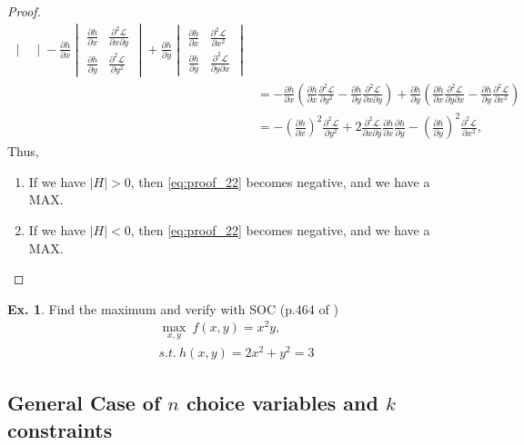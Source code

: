 \documentclass[10pt,a4paper]{book}
\theoremstyle{definition}\newtheorem{definition}{Definition}
\theoremstyle{definition}\newtheorem{fact}{Fact}
\theoremstyle{definition}\newtheorem{ex}{Ex.}
\theoremstyle{definition}\newtheorem{project}{Project}
\theoremstyle{definition}\newtheorem{problem}{Problem}
\theoremstyle{definition}\newtheorem{example}{Example}
\numberwithin{theorem}{chapter}
\numberwithin{corollary}{chapter}
\numberwithin{assumption}{chapter}
\numberwithin{definition}{chapter}
\numberwithin{prop}{chapter}
\numberwithin{notation}{chapter}
\numberwithin{problem}{chapter}
\numberwithin{example}{chapter}
\numberwithin{fact}{chapter}
\numberwithin{ex}{chapter}
\begin{document}
\begin{proof}
\begin{align*}
\begin{vmatrix}
			\end{vmatrix}
		- \frac{\partial h}{\partial x} \begin{vmatrix}
			\frac{\partial h }{\partial x} & \frac{\partial^2 \mathcal{L}}{\partial x \partial y} \\
			\frac{\partial h }{\partial y } & \frac{\partial^2 \mathcal{L}}{\partial y^2}
		\end{vmatrix}
		+ \frac{\partial h}{\partial y} 	\begin{vmatrix}
			\frac{\partial h }{\partial x} & \frac{\partial^2 \mathcal{L}}{\partial x^2 } \\
			\frac{\partial h }{\partial y } & \frac{\partial^2 \mathcal{L}}{\partial y \partial x}
		\end{vmatrix} \\
		&= - \frac{\partial h}{\partial x} \left(\frac{\partial h}{\partial x} \frac{\partial^2\mathcal{L}}{\partial y^2} - \frac{\partial h}{\partial y} \frac{\partial^2\mathcal{L}}{\partial x\partial y} \right) + \frac{\partial h}{\partial y} \left( \frac{\partial h}{\partial x} \frac{\partial^2 \mathcal{L}}{\partial y \partial x} - \frac{\partial h}{\partial y} \frac{\partial^2\mathcal{L}}{\partial x^2} \right)		\\
		&= - \left(\frac{\partial h}{\partial x}\right)^2 \frac{\partial^2 \mathcal{L}}{\partial y^2} + 2 \frac{\partial^2\mathcal{L}}{\partial x\partial y} \frac{\partial h}{\partial x} \frac{\partial h}{\partial y} - \left(\frac{\partial h}{\partial y}\right)^2 \frac{\partial^2 \mathcal{L}}{\partial x^2},
		\end{align*}
		Thus,
		\begin{enumerate}
			\item If we have $|H| > 0$, then \eqref{eq:proof_22} becomes negative, and we have a MAX.
			\item If we have $|H| < 0$, then \eqref{eq:proof_22} becomes negative, and we have a MAX.
		\end{enumerate}
	\end{proof}
	
	\begin{ex} \label{eq:find_ex_cons}
		Find the maximum and verify with SOC (p.464 of \citet{simon1994mathematics})
		\begin{align*}
			\max_{x,y}  \ f(x,y) = x^2 y, \\
				s.t. \ h(x,y) = 2x^2 + y^2 = 3
		\end{align*}
	\end{ex}
	
	\subsection{General Case of $n$ choice variables and $k$ constraints}
	
\end{document}

